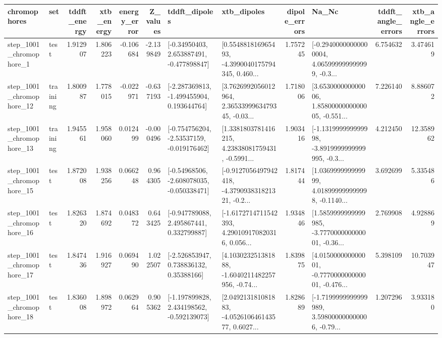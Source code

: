\begin{tabular}{llrrrrllrlrr}
\toprule
             chromophores &       set &  tddft\_energy &  xtb\_energy &  energy\_error &  Z\_values &                               tddft\_dipoles &                                        xtb\_dipoles &  dipole\_errors &                                              Na\_Nc &  tddft\_angle\_errors &  xtb\_angle\_errors \\
\midrule
  step\_1001\_chromophore\_1 &      test &      1.912907 &    1.806223 &     -0.106684 & -2.139849 &    [-0.34950403, 2.653887491, -0.477898847] &  [0.554881816965493, -4.3990040175794345, 0.460... &       1.757245 &  [-0.29400000000000004, 4.065999999999999, -0.3... &            6.754632 &          3.474619 \\
 step\_1001\_chromophore\_12 &  training &      1.800987 &    1.778015 &     -0.022971 & -0.637193 &   [-2.287369813, -1.499455904, 0.193644764] &  [3.7626992056012964, 2.3653399963479345, -0.03... &       1.718006 &  [3.653000000000006, 1.8580000000000005, -0.551... &            7.226140 &          8.886072 \\
 step\_1001\_chromophore\_13 &  training &      1.945561 &    1.958060 &      0.012499 & -0.000496 &   [-0.754756204, -2.53537159, -0.019176462] &  [1.3381803781416215, 4.23838081759431, -0.5991... &       1.903416 &  [-1.131999999999998, -3.8919999999999995, -0.3... &            4.212450 &         12.358962 \\
 step\_1001\_chromophore\_15 &      test &      1.872008 &    1.938256 &      0.066248 &  0.964305 &   [-0.54968506, -2.608078035, -0.050338471] &  [-0.9127056497942418, -4.379093831821321, -0.2... &       1.817444 &  [1.036999999999999, 4.018999999999998, -0.1140... &            3.692699 &          5.335486 \\
 step\_1001\_chromophore\_16 &      test &      1.826320 &    1.874692 &      0.048372 &  0.643425 &    [-0.947789088, 2.495867441, 0.332799887] &  [-1.6172714711542393, 4.290109170820316, 0.056... &       1.934846 &  [1.5859999999999985, -3.777000000000001, -0.36... &            2.769908 &          4.928869 \\
 step\_1001\_chromophore\_17 &      test &      1.847436 &    1.916927 &      0.069490 &  1.022507 &     [-2.526853947, 0.738836132, 0.35388166] &  [4.103023251381888, -1.6040211482257956, -0.74... &       1.839875 &  [4.015000000000001, -0.777000000000001, -0.476... &            5.398109 &         10.703947 \\
 step\_1001\_chromophore\_18 &      test &      1.836008 &    1.898972 &      0.062964 &  0.905362 &   [-1.197899828, 2.434198562, -0.592139073] &  [2.049213181081883, -4.052610646143577, 0.6027... &       1.828689 &  [-1.7199999999999989, 3.598000000000006, -0.79... &            1.207296 &          3.933180 \\

\end{tabular}
